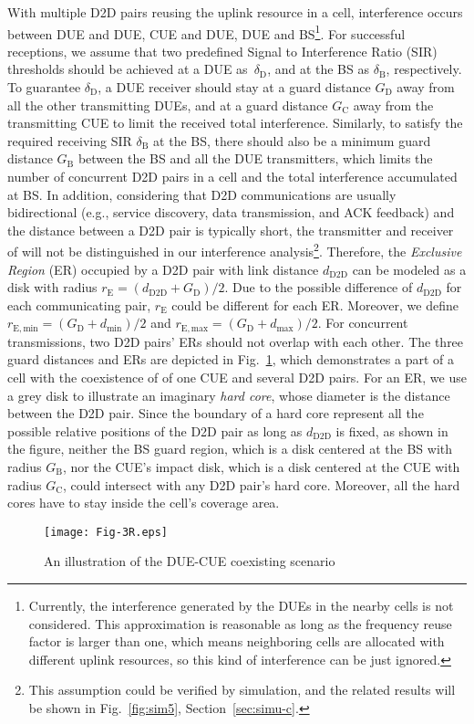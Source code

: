 \documentclass[journal, 10pt]{IEEEtran}
\begin{document}
With multiple D2D pairs reusing the uplink resource in a cell,
interference occurs between DUE and DUE, CUE and DUE, DUE and
BS\footnote{Currently, the interference generated by the DUEs in the
nearby cells is not considered. This approximation is reasonable as
long as the frequency reuse factor is larger than one, which means
neighboring cells are allocated with different uplink resources, so
this kind of interference can be just ignored.}. For successful
receptions, we assume that two predefined Signal to Interference Ratio
(SIR) thresholds should be achieved at a DUE as~$\delta_\mathrm{D}$,
and at the BS as $\delta_\mathrm{B}$, respectively. 
To guarantee $\delta_\mathrm{D}$, a DUE receiver should stay at a
guard distance $G_\mathrm{D}$ away from all the other transmitting
DUEs, and at a guard distance $G_\mathrm{C}$ away from the
transmitting CUE to limit the received total interference. Similarly,
to satisfy the required receiving SIR $\delta_\mathrm{B}$ at the BS,
there should also be a minimum guard distance $G_\mathrm{B}$ between
the BS and all the DUE transmitters, which limits the number of
concurrent D2D pairs in a cell and the total interference accumulated
at BS. In addition, considering that D2D communications are usually
bidirectional (e.g., service discovery, data transmission, and ACK
feedback) and the distance between a D2D pair is typically short, the
transmitter and receiver of  will not be
distinguished in our interference analysis\footnote{This assumption
could be verified by simulation, and the related results will be shown
in Fig.~\ref{fig:sim5}, Section~\ref{sec:simu-c}.}. Therefore, the
\emph{Exclusive Region} (ER) occupied by a D2D pair with link distance
$d_\mathrm{D2D}$ can be modeled as a disk with radius $r_\mathrm{E} =
(d_\mathrm{D2D} +G_\mathrm{D})/2$. Due to the possible difference of
$d_\mathrm{D2D}$ for each communicating pair, $r_\mathrm{E}$ could be
different for each ER. Moreover, we define $r_\mathrm{E, min} =
(G_\mathrm{D} + d_\mathrm{min})/2$ and $r_\mathrm{E, max} =
(G_\mathrm{D} + d_\mathrm{max})/2$. For concurrent transmissions, two
D2D pairs' ERs should not overlap with each other. 
The three guard distances and ERs are depicted in
Fig.~\ref{fig:model3r}, which demonstrates a part of a cell with the
coexistence of of one CUE and several D2D pairs. For an ER, we use a
grey disk to illustrate an imaginary \emph{hard core}, whose diameter
is the distance between the D2D pair. Since the boundary of a hard
core represent all the possible relative positions of the D2D pair as
long as $d_\mathrm{D2D}$ is fixed, as shown in the figure, neither the
BS guard region, which is a disk centered at the BS with radius
$G_\mathrm{B}$, nor the CUE's impact disk, which is a disk centered at
the CUE with radius $G_\mathrm{C}$, could intersect with any D2D
pair's hard core. Moreover, all the hard cores have to stay inside the
cell's coverage area. 
\begin{figure}[!h] \centering
\texttt{[image: Fig-3R.eps]} \caption{An illustration of the DUE-CUE coexisting scenario} 
\label{fig:model3r} 
\end{figure}
\end{document}
